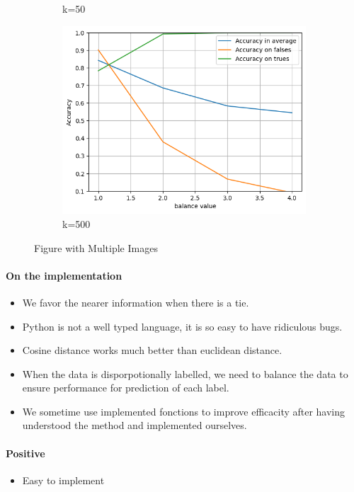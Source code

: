 \documentclass{article}
\begin{document}
\begin{figure}[htbp]
\begin{subfigure}[t]{0.33\textwidth}
    \caption{k=50}
  \end{subfigure}
  \hfill
  \begin{subfigure}[t]{0.33\textwidth}
    \centering
    \includegraphics[width=\linewidth]{balancek500.png}
    \caption{k=500}
  \end{subfigure}
  \caption{Figure with Multiple Images}
  \label{fig:balancenk}
\end{figure}

\paragraph{On the implementation} \begin{itemize}
  \item We favor the nearer information when there is a tie.
  \item Python is not a well typed language, it is so easy to have
  ridiculous bugs.
  \item Cosine distance works much better than euclidean distance.
  \item When the data is disporpotionally labelled, we need to balance the data to ensure performance for prediction of each label.
  \item We sometime use implemented fonctions to improve
  efficacity after having understood the method and
  implemented ourselves.
\end{itemize}

\paragraph{Positive} \begin{itemize}
  \item Easy to implement
\end{itemize}
\end{document}
